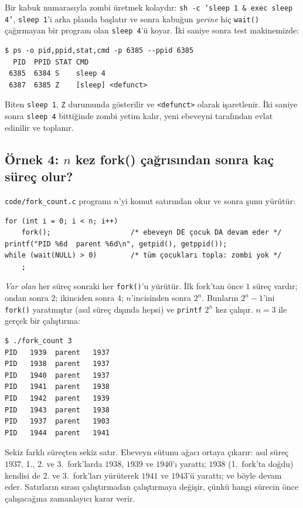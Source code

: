 \documentclass[11pt,a4paper]{article}
\newcommand{\cmd}[1]{\texttt{#1}}
\begin{document}
Bir kabuk numarasıyla zombi üretmek kolaydır: \cmd{sh -c 'sleep 1 \& exec sleep 4'}, \cmd{sleep 1}'i arka planda başlatır ve sonra kabuğun \emph{yerine} hiç \cmd{wait()} çağırmayan bir program olan \cmd{sleep 4}'ü koyar. İki saniye sonra test makinemizde:

\begin{lstlisting}[style=term]
$ ps -o pid,ppid,stat,cmd -p 6385 --ppid 6385
  PID  PPID STAT CMD
 6385  6384 S    sleep 4
 6387  6385 Z    [sleep] <defunct>
\end{lstlisting}

Biten \cmd{sleep 1}, \texttt{Z} durumunda gösterilir ve \texttt{<defunct>} olarak işaretlenir. İki saniye sonra \cmd{sleep 4} bittiğinde zombi yetim kalır, yeni ebeveyni tarafından evlat edinilir ve toplanır.

\subsection{Örnek 4: $n$ kez fork() çağrısından sonra kaç süreç olur?}

\texttt{code/fork\_count.c} programı $n$'yi komut satırından okur ve sonra şunu yürütür:
\begin{lstlisting}
for (int i = 0; i < n; i++)
    fork();                   /* ebeveyn DE çocuk DA devam eder */
printf("PID %6d  parent %6d\n", getpid(), getppid());
while (wait(NULL) > 0)        /* tüm çocukları topla: zombi yok */
    ;
\end{lstlisting}

\emph{Var olan} her süreç sonraki her \cmd{fork()}'u yürütür. İlk fork'tan önce $1$ süreç vardır; ondan sonra $2$; ikinciden sonra $4$; $n$'incisinden sonra $2^{n}$. Bunların $2^{n} - 1$'ini \cmd{fork()} yaratmıştır (asıl süreç dışında hepsi) ve \cmd{printf} $2^{n}$ kez çalışır. $n = 3$ ile gerçek bir çalıştırma:

\begin{lstlisting}[style=term]
$ ./fork_count 3
PID   1939  parent   1937
PID   1938  parent   1937
PID   1940  parent   1937
PID   1941  parent   1938
PID   1942  parent   1939
PID   1943  parent   1938
PID   1937  parent   1903
PID   1944  parent   1941
\end{lstlisting}

Sekiz farklı süreçten sekiz satır. Ebeveyn sütunu ağacı ortaya çıkarır: asıl süreç $1937$, 1., 2. ve 3.~fork'larda $1938$, $1939$ ve $1940$'ı yarattı; $1938$ (1.~fork'ta doğdu) kendisi de 2. ve 3.~fork'ları yürüterek $1941$ ve $1943$'ü yarattı; ve böyle devam eder. Satırların sırası çalıştırmadan çalıştırmaya değişir, çünkü hangi sürecin önce çalışacağına zamanlayıcı karar verir.
\end{document}
